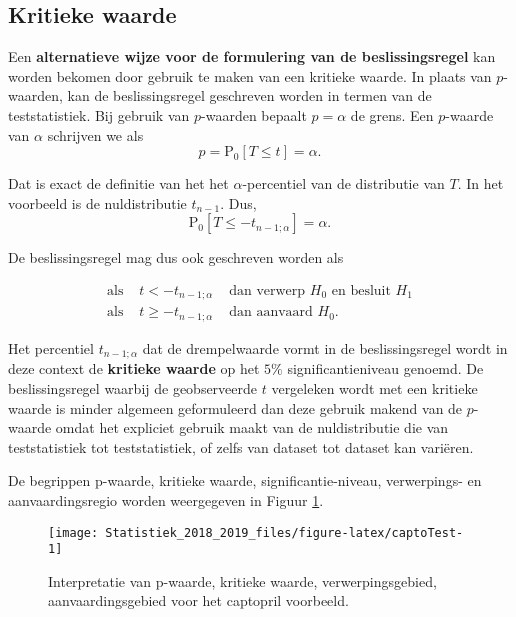 \documentclass[12pt,dutch,coursenotes]{book}
\theoremstyle{definition}
\theoremstyle{definition}
\theoremstyle{definition}
\theoremstyle{remark}
\begin{document}
\subsection{Kritieke waarde}\label{kritieke-waarde}

Een \textbf{alternatieve wijze voor de formulering van de
beslissingsregel} kan worden bekomen door gebruik te maken van een
kritieke waarde. In plaats van \(p\)-waarden, kan de beslissingsregel
geschreven worden in termen van de teststatistiek. Bij gebruik van
\(p\)-waarden bepaalt \(p=\alpha\) de grens. Een \(p\)-waarde van
\(\alpha\) schrijven we als
\[p=\text{P}_0 \left[ T \leq t \right]=\alpha.\]

Dat is exact de definitie van het het \(\alpha\)-percentiel van de
distributie van \(T\). In het voorbeeld is de nuldistributie
\(t_{n-1}\).
Dus,\[\text{P}_0\left[T\leq -t_{n-1;\alpha}\right]=\alpha.\]

De beslissingsregel mag dus ook geschreven worden als

\begin{eqnarray*} 
\text{als } & t< -t_{n-1;\alpha} & \text{ dan verwerp }H_0\text{ en besluit }H_1 \\
  \text{als } & t\geq -t_{n-1;\alpha} & \text{ dan aanvaard }H_0.
\end{eqnarray*}

Het percentiel \(t_{n-1;\alpha}\) dat de drempelwaarde vormt in de
beslissingsregel wordt in deze context de \textbf{kritieke waarde} op
het \(5\%\) significantieniveau genoemd. De beslissingsregel waarbij de
geobserveerde \(t\) vergeleken wordt met een kritieke waarde is minder
algemeen geformuleerd dan deze gebruik makend van de \(p\)-waarde omdat
het expliciet gebruik maakt van de nuldistributie die van teststatistiek
tot teststatistiek, of zelfs van dataset tot dataset kan variëren.

De begrippen p-waarde, kritieke waarde, significantie-niveau,
verwerpings- en aanvaardingsregio worden weergegeven in Figuur
\ref{fig:captoTest}.

\begin{figure}

{\centering \texttt{[image: Statistiek\_2018\_2019\_files/figure-latex/captoTest-1]} 

}

\caption{Interpretatie van p-waarde, kritieke waarde, verwerpingsgebied, aanvaardingsgebied voor het captopril voorbeeld.}\label{fig:captoTest}
\end{figure}
\end{document}
